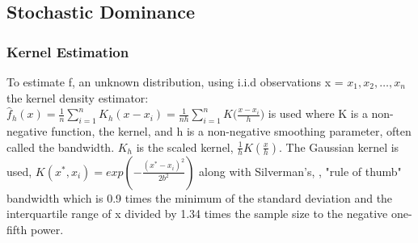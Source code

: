 \subsection{Stochastic Dominance}
\subsubsection{Kernel Estimation}
To estimate f, an unknown distribution, using i.i.d observations x = {$x_{1}, x_{2}, \dots, x_{n}$} the kernel density estimator:\\
$\widehat{f}_{h}(x)={\frac{1}{n}}\sum_{i=1}^{n}K_{h}(x-x_{i})={\frac{1}{nh}}\sum_{i=1}^{n}K{\Big(}{\frac{x-x_{i}}{h}}{\Big)}$
is used where K is a non-negative function, the kernel, and h is a non-negative smoothing parameter, often called the bandwidth. $K_{h}$ is the scaled kernel, $\frac{1}{h}K(\frac{x}{h})$. The Gaussian kernel is used, 
$K(x^{*},x_{i})= exp\left(-{\frac  {(x^{*}-x_{i})^{2}}{2b^{2}}}\right)$
along with Silverman's, \citet{silverman2018density}, "rule of thumb" bandwidth which is 0.9 times the minimum of the standard deviation and the interquartile range of x divided by 1.34 times the sample size to the negative one-fifth power.
